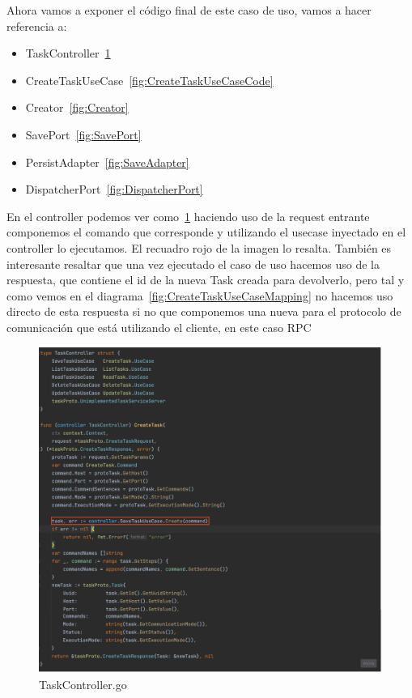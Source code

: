 Ahora vamos a exponer el código final de este caso de uso, vamos a hacer referencia a:
\begin{itemize}
    \item TaskController~\cref{fig:TaskControler}
    \item CreateTaskUseCase~\cref{fig:CreateTaskUseCaseCode}
    \item Creator~\cref{fig:Creator}
    \item SavePort~\cref{fig:SavePort}
    \item PersistAdapter~\cref{fig:SaveAdapter}
    \item DispatcherPort~\cref{fig:DispatcherPort}
\end{itemize}

En el controller podemos ver como~\cref{fig:TaskControler} haciendo uso de la request entrante componemos el comando que corresponde y utilizando el usecase inyectado en el controller lo ejecutamos.
El recuadro rojo de la imagen lo resalta.
También es interesante resaltar que una vez ejecutado el caso de uso hacemos uso de la respuesta, que contiene el id de la nueva Task creada para devolverlo, pero tal y como vemos en el diagrama~\cref{fig:CreateTaskUseCaseMapping} no hacemos uso directo de esta respuesta si no que componemos una nueva para el protocolo de comunicación que está utilizando el cliente, en este caso RPC

\begin{figure}[H]
    \centering
    \includegraphics[height=0.5\textheight]{./part/Ejecucion/Seguimiento/CreateTaskUseCase/img/PFM - TaskController}
    \caption{TaskController.go}\label{fig:TaskControler}
\end{figure}

